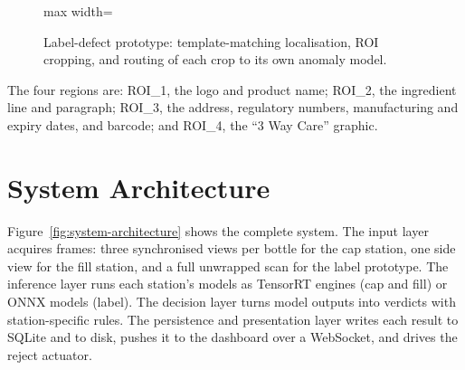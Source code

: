 \begin{figure}[htbp]
\centering
\begin{adjustbox}{max width=\textwidth}
\end{adjustbox}
\caption[Label-defect prototype pipeline]{Label-defect prototype: template-matching localisation, ROI cropping, and routing of each crop to its own anomaly model.}
\label{fig:label-pipeline}
\end{figure}

The four regions are: ROI\_1, the logo and product name; ROI\_2, the ingredient line and paragraph; ROI\_3, the address, regulatory numbers, manufacturing and expiry dates, and barcode; and ROI\_4, the ``3 Way Care'' graphic.

\section{System Architecture}
\label{sec:system-architecture}

Figure~\ref{fig:system-architecture} shows the complete system. The input layer acquires frames: three synchronised views per bottle for the cap station, one side view for the fill station, and a full unwrapped scan for the label prototype. The inference layer runs each station's models as TensorRT engines (cap and fill) or ONNX models (label). The decision layer turns model outputs into verdicts with station-specific rules. The persistence and presentation layer writes each result to SQLite and to disk, pushes it to the dashboard over a WebSocket, and drives the reject actuator.

